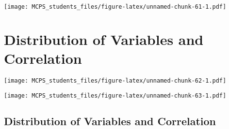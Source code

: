 \documentclass[]{article}
\newenvironment{Shaded}{\begin{snugshade}}{\end{snugshade}}
\newcommand{\CommentTok}[1]{\textcolor[rgb]{0.56,0.35,0.01}{\textit{#1}}}
\newcommand{\DataTypeTok}[1]{\textcolor[rgb]{0.13,0.29,0.53}{#1}}
\newcommand{\KeywordTok}[1]{\textcolor[rgb]{0.13,0.29,0.53}{\textbf{#1}}}
\newcommand{\NormalTok}[1]{#1}
\newcommand{\OperatorTok}[1]{\textcolor[rgb]{0.81,0.36,0.00}{\textbf{#1}}}
\newcommand{\StringTok}[1]{\textcolor[rgb]{0.31,0.60,0.02}{#1}}
\begin{document}
\texttt{[image: MCPS\_students\_files/figure-latex/unnamed-chunk-61-1.pdf]}

\hypertarget{distribution-of-variables-and-correlation}{%
\section{Distribution of Variables and
Correlation}\label{distribution-of-variables-and-correlation}}

\begin{Shaded}
\end{Shaded}

\texttt{[image: MCPS\_students\_files/figure-latex/unnamed-chunk-62-1.pdf]}

\begin{Shaded}
\end{Shaded}

\texttt{[image: MCPS\_students\_files/figure-latex/unnamed-chunk-63-1.pdf]}

\hypertarget{distribution-of-variables-and-correlation-1}{%
\subsection{Distribution of Variables and
Correlation}\label{distribution-of-variables-and-correlation-1}}
\end{document}
